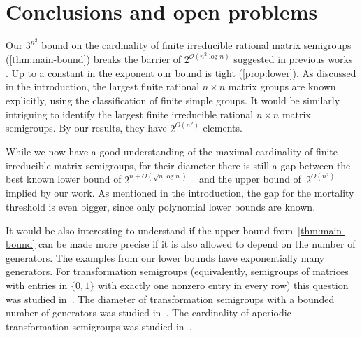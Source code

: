 \documentclass{lmcs}
\theoremstyle{definition}
\newcommand{\OO}{\mathcal{O}}
\begin{document}
\section{Conclusions and open problems}\label{sec:conclusions}
Our $3^{n^2}$ bound on the cardinality of finite irreducible rational matrix semigroups (\cref{thm:main-bound}) breaks the barrier of $2^{\OO(n^2 \log n)}$ suggested in previous works \cite{Schutzenberger62,Berstel2011,AlmeidaSteinberg09,BumpusHKST20}.
Up to a constant in the exponent our bound is tight (\cref{prop:lower}).
As discussed in the introduction, the largest finite rational $n \times n$ matrix groups are known explicitly, using the classification of finite simple groups.
It would be similarly intriguing to identify the largest finite irreducible rational $n \times n$ matrix semigroups.
By our results, they have $2^{\Theta(n^2)}$ elements.

While we now have a good understanding of the maximal cardinality of finite irreducible matrix semigroups, for their diameter there is still a gap between the best known lower bound of $2^{n + \Theta(\sqrt{n \log n})}$ ~\cite{Panteleev15} and the upper bound of~$2^{\Theta(n^2)}$ implied by our work. As mentioned in the introduction, the gap for the mortality threshold is even bigger, since only polynomial lower bounds are known.

It would be also interesting to understand if the upper bound from~\cref{thm:main-bound} can be made more precise if it is also allowed to depend on the number of generators. The examples from our lower bounds have exponentially many generators. For transformation semigroups (equivalently, semigroups of matrices with entries in $\{0, 1\}$ with exactly one nonzero entry in every row) this question was studied in~\cite{Holzer2004}. The diameter of transformation semigroups with a bounded number of generators was studied in~\cite{Ryzhikov2025DiamArxiv}. The cardinality of aperiodic transformation semigroups was studied in~\cite{Brzozowski2015}.



\end{document}
